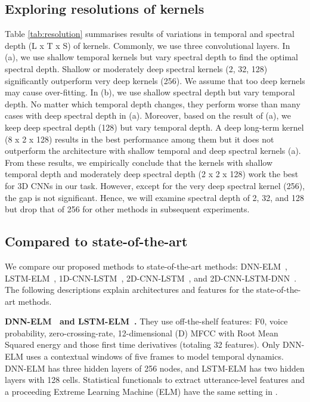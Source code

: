 \documentclass[conference, compsoc, twoside]{IEEEtran}
\begin{document}
\subsection{Exploring resolutions of kernels}
Table \ref{tab:resolution} summarises results of variations in temporal and spectral depth (L x T x S) of kernels. Commonly, we use three convolutional layers. In (a), we use shallow temporal kernels but vary spectral depth to find the optimal spectral depth. Shallow or moderately deep spectral kernels (2, 32, 128) significantly outperform very deep kernels (256). We assume that too deep kernels may cause over-fitting. In (b), we use shallow spectral depth but vary temporal depth. No matter which temporal depth changes, they perform worse than many cases with deep spectral depth in (a). Moreover, based on the result of (a), we keep deep spectral depth (128) but vary temporal depth. A deep long-term kernel (8 x 2 x 128) results in the best performance among them but it does not outperform the architecture with shallow temporal and deep spectral kernels (a). From these results, we empirically conclude that the kernels with shallow temporal depth and moderately deep spectral depth (2 x 2 x 128) work the best for 3D CNNs in our task. However, except for the very deep spectral kernel (256), the gap is not significant. Hence, we will examine spectral depth of 2, 32, and 128 but drop that of 256 for other methods in subsequent experiments.

\subsection{Compared to state-of-the-art}
We compare our proposed methods to state-of-the-art methods: DNN-ELM~\cite{kunHan2014dnn}, LSTM-ELM~\cite{lee2015high}, 1D-CNN-LSTM~\cite{trigeorgis2016adieu}, 2D-CNN-LSTM~\cite{anandconvoluted}, and 2D-CNN-LSTM-DNN~\cite{sainath2015convolutional}. The following descriptions explain architectures and features for the state-of-the-art methods.

\textbf{DNN-ELM~\cite{kunHan2014dnn} and LSTM-ELM~\cite{lee2015high}.} They use off-the-shelf features: F0, voice probability, zero-crossing-rate, 12-dimensional (D) MFCC with Root Mean Squared energy and those first time derivatives (totaling 32 features). Only DNN-ELM uses a contextual windows of five frames to model temporal dynamics. DNN-ELM has three hidden layers of 256 nodes, and LSTM-ELM has two hidden layers with 128 cells. Statistical functionals to extract utterance-level features and a proceeding Extreme Learning Machine (ELM) have the same setting in \cite{kunHan2014dnn,lee2015high}.
\end{document}
